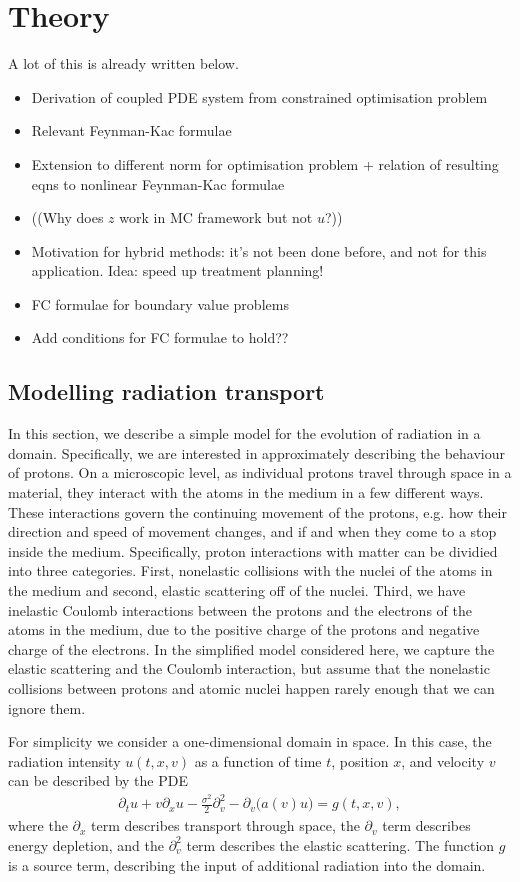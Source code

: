 \section{Theory}
A lot of this is already written below.
\begin{itemize}
    \item Derivation of coupled PDE system from constrained optimisation problem 
    \item Relevant Feynman-Kac formulae 
    \item Extension to different norm for optimisation problem + relation of resulting eqns to nonlinear Feynman-Kac formulae
    \item ((Why does $z$ work in MC framework but not $u$?))
    \item Motivation for hybrid methods: it's not been done before, and not for this application. Idea: speed up treatment planning! 
    \item FC formulae for boundary value problems
    \item Add conditions for FC formulae to hold??
\end{itemize}

\subsection{Modelling radiation transport}
In this section, we describe a simple model for the evolution of radiation in a domain. Specifically, we are interested in approximately describing the behaviour of protons. On a microscopic level, as individual protons travel through space in a material, they interact with the atoms in the medium in a few different ways. These interactions govern the continuing movement of the protons, e.g. how their direction and speed of movement changes, and if and when they come to a stop inside the medium. Specifically, proton interactions with matter can be dividied into three categories. First, nonelastic collisions with the nuclei of the atoms in the medium and second, elastic scattering off of the nuclei. Third, we have inelastic Coulomb interactions between the protons and the electrons of the atoms in the medium, due to the positive charge of the protons and negative charge of the electrons. In the simplified model considered here, we capture the elastic scattering and the Coulomb interaction, but assume that the nonelastic collisions between protons and atomic nuclei happen rarely enough that we can ignore them. 

For simplicity we consider a one-dimensional domain in space. In this case, the radiation intensity $u(t,x,v)$ as a function of time $t$, position $x$, and velocity $v$ can be described by the PDE
%
\begin{align}
    \label{eq:pde-model}
    \partial_t u + v \partial_x u - \frac{\sigma^2}{2} \partial_v^2 - \partial_v \big( a(v) u\big) = g(t,x,v),
\end{align}
%
where the $\partial_x$ term describes transport through space, the $\partial_v$ term describes energy depletion, and the $\partial_v^2$ term describes the elastic scattering. The function $g$ is a source term, describing the input of additional radiation into the domain. 

